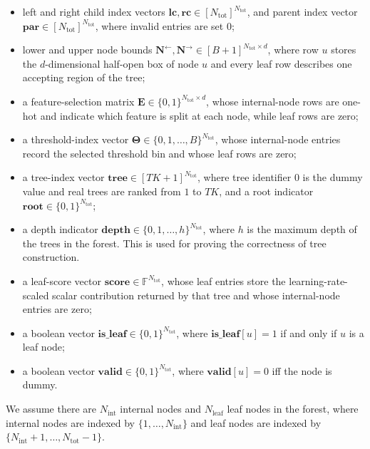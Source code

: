 \begin{itemize}
  \item left and right child index vectors
  $\mathbf{lc},\mathbf{rc}\in[N_{\mathrm{tot}}]^{N_{\mathrm{tot}}}$,
  and parent index vector $\mathbf{par}\in[N_{\mathrm{tot}}]^{N_{\mathrm{tot}}}$, where invalid entries are set $0$;
  \item lower and upper node bounds
  $\mathbf{N}^{\leftarrow},\mathbf{N}^{\rightarrow}\in[B+1]^{N_{\mathrm{tot}}\times d}$,
  where row $u$ stores the $d$-dimensional half-open box of node $u$ and every
  leaf row describes one accepting region of the tree;
  \item a feature-selection matrix
  $\mathbf{E}\in\{0,1\}^{N_{\mathrm{tot}}\times d}$,
  whose internal-node rows are one-hot and indicate which feature is split at
  each node, while leaf rows are zero;
  \item a threshold-index vector
  $\boldsymbol{\Theta}\in\{0,1,\ldots,B\}^{N_{\mathrm{tot}}}$,
  whose internal-node entries record the selected threshold bin and whose leaf rows are zero;
  \item a tree-index vector $\mathbf{tree}\in[TK+1]^{N_{\mathrm{tot}}}$, where tree identifier $0$ is the dummy value and real trees are ranked from $1$ to $TK$, and a
  root indicator $\mathbf{root}\in\{0,1\}^{N_{\mathrm{tot}}}$;
  \item a depth indicator $\mathbf{depth}\in\{0,1,\ldots,h\}^{N_{\mathrm{tot}}}$, where $h$ is the maximum depth of the trees in the forest. This is used for proving the correctness of tree construction.
  \item a leaf-score vector $\mathbf{score}\in\mathbb{F}^{N_{\mathrm{tot}}}$,
  whose leaf entries store the learning-rate-scaled scalar contribution
  returned by that tree and whose internal-node entries are zero;
  \item a boolean vector $\mathbf{is\_leaf}\in\{0,1\}^{N_{\mathrm{tot}}}$, 
  where $\mathbf{is\_leaf}[u]=1$ if and only if $u$ is a leaf node;
  \item a boolean vector $\mathbf{valid}\in \{0, 1\}^{N_{\mathrm{tot}}}$, where $\mathbf{valid}[u]=0$ iff the node is dummy.
\end{itemize}

We assume there are $N_{\mathrm{int}}$ internal nodes and $N_{\mathrm{leaf}}$ leaf nodes
in the forest, where internal nodes are indexed by $\{1,\ldots,N_{\mathrm{int}}\}$ and leaf nodes are indexed by
$\{N_{\mathrm{int}}+1, \dots, N_{\mathrm{tot}}-1\}$.

